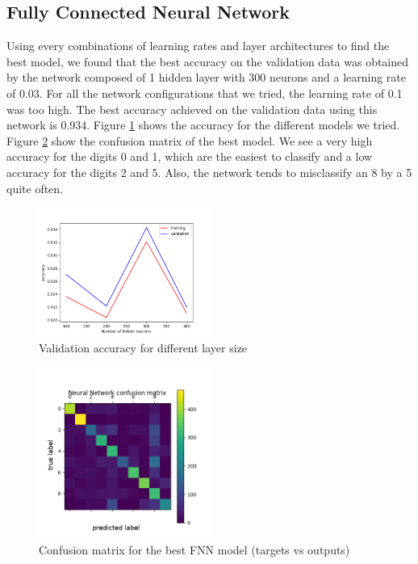 \documentclass[letterpaper, 10 pt, conference]{ieeeconf}  %
\begin{document}
\subsection{Fully Connected Neural Network}
Using every combinations of learning rates and layer architectures to find the best model, we found that the best accuracy on the validation data was obtained by the network composed of 1 hidden layer with 300 neurons and a learning rate of 0.03. For all the network configurations that we tried, the learning rate of 0.1 was too high. The best accuracy achieved on the validation data using this network is 0.934. Figure \ref{fig:fnntune} shows the accuracy for the different models we tried. Figure \ref{fig:fnnconf} show the confusion matrix of the best model. We see a very high accuracy for the digits 0 and 1, which are the easiest to classify and a low accuracy for the digits 2 and 5. Also, the network tends to misclassify an 8 by a 5 quite often.

\begin{figure}
	\begin{center}
			\includegraphics[width=0.5\textwidth]{figures/fnn_tune.png}  %
		\caption{Validation accuracy for different layer size}
		\label{fig:fnntune}
	\end{center}
\end{figure}
\begin{figure}
	\begin{center}
			\includegraphics[width=0.5\textwidth]{figures/fnn_conf.png}  %
		\caption{Confusion matrix for the best FNN model (targets vs outputs)}
		\label{fig:fnnconf}
	\end{center}
\end{figure}
\end{document}
